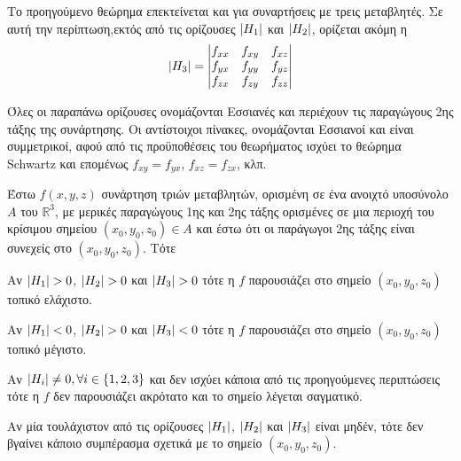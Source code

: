 Το προηγούμενο θεώρημα επεκτείνεται και για συναρτήσεις με τρεις μεταβλητές. Σε αυτή 
την περίπτωση,εκτός από τις ορίζουσες $ \abs{H_{1}} $ και $ \abs{H_{2}} $, ορίζεται 
ακόμη η
\[
    \abs{H_{3}} = 
    \begin{vmatrix}
        f_{xx} & f_{xy} & f_{xz} \\
        f_{yx} & f_{yy} & f_{yz} \\
        f_{zx} & f_{zy} & f_{zz}
    \end{vmatrix} 
    \hfill 
\] 

\begin{rem}
    Όλες οι παραπάνω ορίζουσες ονομάζονται Εσσιανές και περιέχουν τις παραγώγους 
    2ης τάξης της συνάρτησης. Οι αντίστοιχοι πίνακες, ονομάζονται Εσσιανοί και είναι 
    συμμετρικοί, αφού από τις προϋποθέσεις του θεωρήματος ισχύει το θεώρημα Schwartz και 
    επομένως $ f_{xy} = f_{yx} $, $ f_{xz} = f_{zx} $, κλπ.
\end{rem}


\begin{thm}
    \label{thm:3var}
\item {}
    Έστω $ f(x,y,z) $ συνάρτηση τριών μεταβλητών, ορισμένη σε ένα ανοιχτό 
    υποσύνολο $A$ του $ \mathbb{R}^{3} $, με μερικές παραγώγους 1ης και 2ης τάξης 
    ορισμένες σε μια  περιοχή του κρίσιμου σημείου $ (x_{0}, y_{0}, z_{0}) \in A $ και 
    έστω ότι οι παράγωγοι 2ης τάξης είναι συνεχείς στο $ (x_{0}, y_{0}, z_{0}) $. Τότε
\end{thm}

\begin{myitemize}
    \item Αν $ \abs{H_{1}} > 0 $, $ \abs{H_{2}} > 0 $ και $ \abs{H_{3}} > 0 $ 
        τότε η $f$ παρουσιάζει στο σημείο $ (x_{0}, y_{0}, z_{0}) $ τοπικό ελάχιστο.
    \item Αν $ \abs{H_{1}} < 0 $, $ \abs{H_{2}} > 0 $ και $ \abs{H_{3}} < 0 $ 
        τότε η $f$ παρουσιάζει στο σημείο $ (x_{0}, y_{0}, z_{0}) $ τοπικό μέγιστο.
    \item Αν $ \abs{H_{i}} \neq 0, \forall i \in \{1,2,3\} $ και δεν ισχύει κάποια 
        από τις προηγούμενες περιπτώσεις τότε η $f$ δεν παρουσιάζει ακρότατο και το 
        σημείο λέγεται σαγματικό.
    \item Αν μία τουλάχιστον από τις ορίζουσες $ \abs{H_{1}} $, $ \abs{H_{2}} $ και 
        $ \abs{H_{3}} $ είναι μηδέν, τότε δεν βγαίνει κάποιο συμπέρασμα σχετικά με το 
        σημείο $ (x_{0}, y_{0}, z_{0}) $.
\end{myitemize}

